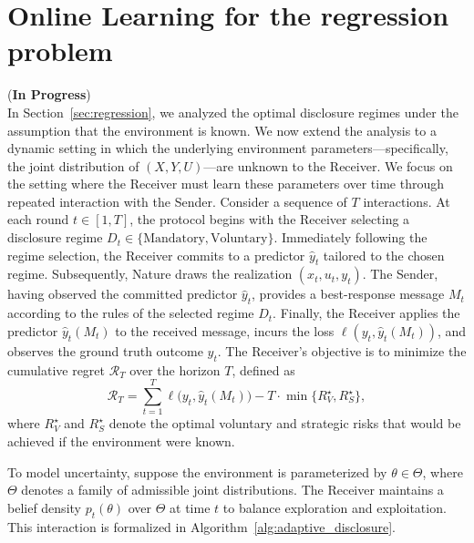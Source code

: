 \section{Online Learning for the regression problem}
\label{sec:online_learning}
(\textbf{In Progress})\\
In Section~\ref{sec:regression}, we analyzed the optimal disclosure regimes under the assumption that the environment is known. We now extend the analysis to a dynamic setting in which the underlying environment parameters—specifically, the joint distribution of $(X, Y, U)$—are unknown to the Receiver. We focus on the setting where the Receiver must learn these parameters over time through repeated interaction with the Sender. Consider a sequence of $T$ interactions. At each round $t \in [1, T]$, the protocol begins with the Receiver selecting a disclosure regime $D_t \in \{\text{Mandatory}, \text{Voluntary}\}$. Immediately following the regime selection, the Receiver commits to a predictor $\hat{y}_t$ tailored to the chosen regime. Subsequently, Nature draws the realization $(x_t, u_t, y_t)$. The Sender, having observed the committed predictor $\hat{y}_t$, provides a best-response message $M_t$ according to the rules of the selected regime $D_t$. Finally, the Receiver applies the predictor $\hat{y}_t(M_t)$ to the received message, incurs the loss $\ell(y_t, \hat{y}_t(M_t))$, and observes the ground truth outcome $y_t$.
The Receiver’s objective is to minimize the cumulative regret $\mathcal{R}_T$ over the horizon $T$, defined as
\begin{equation}
    \mathcal{R}_T = \sum_{t=1}^T \ell\big(y_t, \hat{y}_t(M_t)\big) - T \cdot \min \{ R_V^\star, R_S^\star \},
\end{equation}
where $R_V^\star$ and $R_S^\star$ denote the optimal voluntary and strategic risks that would be achieved if the environment were known.

To model uncertainty, suppose the environment is parameterized by $\theta \in \Theta$, where $\Theta$ denotes a family of admissible joint distributions. The Receiver maintains a belief density $p_t(\theta)$ over $\Theta$ at time $t$ to balance exploration and exploitation. This interaction is formalized in Algorithm~\ref{alg:adaptive_disclosure}.

